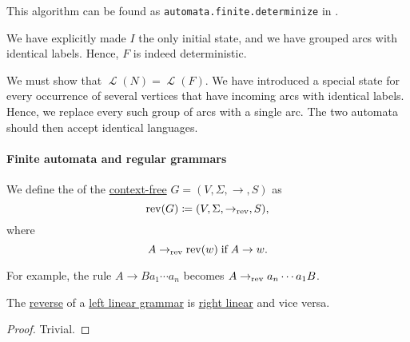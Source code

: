 \begin{comments}
  \item This algorithm can be found as \texttt{automata.finite.determinize} in \cite{notebook:code}.
\end{comments}
\begin{defproof}
  We have explicitly made \( I \) the only initial state, and we have grouped arcs with identical labels. Hence, \( F \) is indeed deterministic.

  We must show that \( \mscrL(N) = \mscrL(F) \). We have introduced a special state for every occurrence of several vertices that have incoming arcs with identical labels. Hence, we replace every such group of arcs with a single arc. The two automata should then accept identical languages.
\end{defproof}

\paragraph{Finite automata and regular grammars}

\begin{definition}\label{def:reverse_grammar}
  We define the  of the \hyperref[def:chomsky_hierarchy/context_free]{context-free} \( G = (V, \Sigma, \to, S) \) as
  \begin{equation*}
    \op{rev}(G) \coloneqq (V, \Sigma, \to_{\op{rev}}, S),
  \end{equation*}
  where
  \begin{equation*}
    A \to_{\op{rev}} \op{rev}(w) \T{if} A \to w.
  \end{equation*}
\end{definition}
\begin{comments}
  \item For example, the rule \( A \to Ba_1 \cdots a_n \) becomes \( A \to_{\op{rev}} a_n \cdots a_1 B \).
\end{comments}

\begin{proposition}\label{thm:reverse_linear_grammar}
  The \hyperref[def:reverse_grammar]{reverse} of a \hyperref[def:chomsky_hierarchy/regular]{left linear grammar} is \hyperref[def:chomsky_hierarchy/regular]{right linear} and vice versa.
\end{proposition}
\begin{proof}
  Trivial.
\end{proof}

